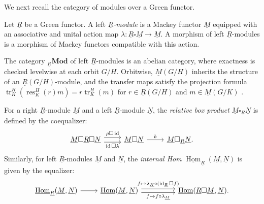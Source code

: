 \documentclass[11pt,oneside]{amsart}
\DeclareMathOperator{\Hom}{Hom}
\DeclareMathOperator{\res}{res}
\DeclareMathOperator{\tr}{tr}
\DeclareMathOperator{\id}{id}
\numberwithin{equation}{section}
\numberwithin{figure}{section}
\theoremstyle{plain}
\theoremstyle{definition}
\theoremstyle{remark}
\begin{document}
We next recall the category of modules over a Green functor.

\begin{definition}
Let $\underline{R}$ be a Green functor. A left \emph{$\underline{R}$-module} is a Mackey functor $\underline{M}$ equipped with an associative and unital action map $\lambda\colon\underline{R}\square \underline{M}\to \underline{M}$. A morphism of left $\underline{R}$-modules is a morphism of Mackey functors compatible with this action. 
\end{definition}

\begin{remark}
The category ${}_{\underline{R}}\mathbf{Mod}$ of left $\underline{R}$-modules is an abelian category, where exactness is checked levelwise at each orbit $G/H$. Orbitwise, $\underline{M}(G/H)$ inherits the structure of an $\underline{R}(G/H)$-module, and the transfer maps satisfy the projection formula $\tr_K^H(\res_K^H(r)m) = r\tr_K^H(m)$ for $r\in\underline{R}(G/H)$ and $m\in\underline{M}(G/K)$ \cite[Def.~2.6]{ventura2005homological}.
\end{remark}

\begin{definition} \label{def:relative-box-equalizer}
For a right $\underline{R}$-module $\underline{M}$ and a left $\underline{R}$-module $\underline{N}$, the \emph{relative box product} $\underline{M} \square_{\underline{R}} \underline{N}$ is defined by the coequalizer:
\[
\begin{tikzcd}
\underline{M}\square \underline{R}\square \underline{N}\arrow[r, shift right = .75ex,"\id\square\lambda"'] 
\arrow[r, shift left = .75ex,"\rho\square \id"]  &\underline{M}\square \underline{N}\ar[r,"b"]&\underline{M}\square_{\underline{R}} \underline{N}.
\end{tikzcd}
\]
Similarly, for left $\underline{R}$-modules $\underline{M}$ and $\underline{N}$, the \emph{internal Hom} $\underline{\Hom}_{\underline{R}}(\underline{M},\underline{N})$ is given by the equalizer: 
\[
\begin{tikzcd}
\underline{\Hom}_{\underline{R}}(\underline{M},\underline{N}) \ar[r] & \underline{\Hom}(\underline{M},\underline{N}) \ar[rr, shift left=.6ex, "f \mapsto \lambda_{\underline{N}}\circ(\id_{\underline{R}}\square f)"] \ar[rr, shift right=.6ex, "f \mapsto f\circ\lambda_{\underline{M}}"'] && \underline{\Hom}(\underline{R}\square\underline{M},\underline{N}).
\end{tikzcd}
\]
\end{definition}
\end{document}
